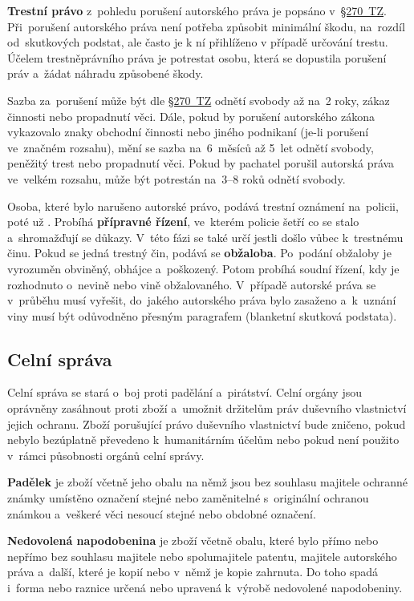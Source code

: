 \textbf{Trestní právo} z~pohledu porušení autorského práva je popsáno v~\href{https://www.zakonyprolidi.cz/cs/2009-40#p270}{§270~TZ}. Při~porušení autorského práva není potřeba způsobit minimální škodu, na~rozdíl od~skutkových podstat, ale často je k ní přihlíženo v případě určování trestu. Účelem trestněprávního práva je potrestat osobu, která se dopustila porušení práv a~žádat náhradu způsobené škody.

Sazba za~porušení může být dle \href{https://www.zakonyprolidi.cz/cs/2009-40#p270}{§270~TZ} odnětí svobody až na~2 roky, zákaz činnosti nebo propadnutí věci. Dále, pokud by porušení autorského zákona vykazovalo znaky obchodní činnosti nebo jiného podnikaní (je-li porušení ve~značném rozsahu), mění se sazba na~6~měsíců až 5~let odnětí svobody, peněžitý trest nebo propadnutí věci. Pokud by pachatel porušil autorská práva ve~velkém rozsahu, může být potrestán na~3--8 roků odnětí svobody.

Osoba, které bylo narušeno autorské právo, podává trestní oznámení na~policii, poté už . Probíhá \textbf{přípravné řízení}, ve~kterém policie šetří co se stalo a~shromažďují se důkazy. V~této fázi se také určí jestli došlo vůbec k~trestnému činu. Pokud se jedná trestný čin, podává se \textbf{obžaloba}. Po~podání obžaloby je vyrozuměn obviněný, obhájce a~poškozený. Potom probíhá soudní řízení, kdy je rozhodnuto o~nevině nebo vině obžalovaného. V~případě autorské práva se v~průběhu musí vyřešit, do~jakého autorského práva bylo zasaženo a~k~uznání viny musí být odůvodněno přesným paragrafem (blanketní skutková podstata).

\subsection{Celní správa}

Celní správa se stará o~boj proti padělání a~pirátství. Celní orgány jsou oprávněny zasáhnout proti zboží a~umožnit držitelům práv duševního vlastnictví jejich ochranu. Zboží porušující právo duševního vlastnictví bude zničeno, pokud nebylo bezúplatně převedeno k~humanitárním účelům nebo pokud není použito v~rámci působnosti orgánů celní správy.

\textbf{Padělek} je zboží včetně jeho obalu na němž jsou bez souhlasu majitele ochranné známky umístěno označení stejné nebo zaměnitelné s~originální ochranou známkou a~veškeré věci nesoucí stejné nebo obdobné označení.

\textbf{Nedovolená napodobenina} je zboží včetně obalu, které bylo přímo nebo nepřímo bez souhlasu majitele nebo spolumajitele patentu, majitele autorského práva a~další, které je kopií nebo v~němž je kopie zahrnuta. Do toho spadá i~forma nebo raznice určená nebo upravená k~výrobě nedovolené napodobeniny.

